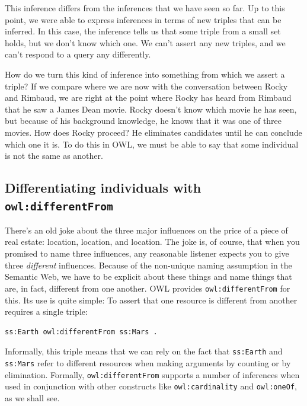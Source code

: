 This inference differs from the inferences that we have seen so far. Up
to this point, we were able to express inferences in terms of new
triples that can be inferred. In this case, the inference tells us that
some triple from a small set holds, but we don't know which one. We
can't assert any new triples, and we can't respond to a query any
differently.

How do we turn this kind of inference into something from which we
assert a triple? If we compare where we are now with the conversation
between Rocky and Rimbaud, we are right at the point where Rocky has
heard from Rimbaud that he saw a James Dean movie. Rocky doesn't know
which movie he has seen, but because of his background knowledge, he
knows that it was one of three movies. How does Rocky proceed? He
eliminates candidates until he can conclude which one it is. To do this
in OWL, we must be able to say that some individual is not the same as
another.

\subsection{Differentiating individuals with \texttt{owl:differentFrom}}

There's an old joke about the three major influences on the price of a
piece of real estate: location, location, and location. The joke is, of
course, that when you promised to name three influences, any reasonable
listener expects you to give three \emph{different} influences. Because of the
non-unique naming assumption in the Semantic Web, we have to be explicit
about these things and name things that are, in fact, different from one
another. OWL provides \texttt{owl:differentFrom} for this. Its use is quite
simple: To assert that one resource is different from another requires a
single triple:

\begin{lstlisting}
ss:Earth owl:differentFrom ss:Mars .
\end{lstlisting}

Informally, this triple means that we can rely on the fact that \texttt{ss:Earth}
and \texttt{ss:Mars} refer to different resources when making arguments by
counting or by elimination. Formally, \texttt{owl:differentFrom} supports a
number of inferences when used in conjunction with other constructs like
\texttt{owl:cardinality} and \texttt{owl:oneOf}, as we shall see.

